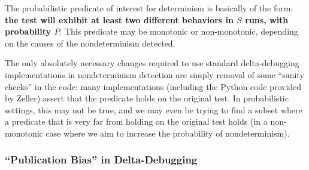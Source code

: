 The probabilistic predicate of interest for determinism is basically of
the form:  {\bf the test will exhibit at least two different behaviors in $S$
runs, with probability $P$}.  This predicate may be monotonic or
non-monotonic, depending on the causes of the nondeterminism detected.

The only absolutely necessary changes required to use standard
delta-debugging implementations in nondeterminism detection
are simply removal of some ``sanity checks'' in the code:  many
implementations (including the Python code provided by Zeller) assert
that the predicate holds on the original test.  In probabilistic
settings, this may not be true, and we may even be trying to find a
subset where a predicate that is very far from holding on the original test
holds (in a non-monotonic case where we aim to increase the probability
of nondeterminism).

\subsubsection{``Publication Bias'' in Delta-Debugging}
\label{sec:pubbias}

